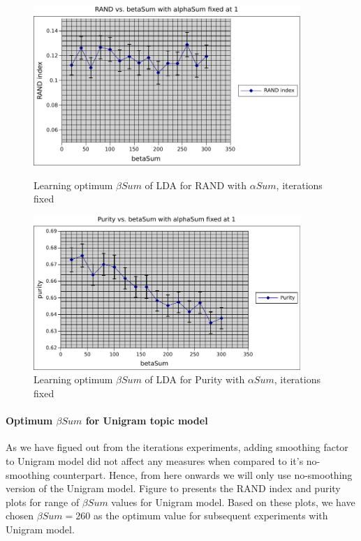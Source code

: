 \begin{figure}
    \centering
    \begin{minipage}{0.45\textwidth}
        \centering
        \includegraphics[width=0.9\textwidth]{fig/betaSum_rand_lda.pdf}
        \caption{Learning optimum $\beta Sum$ of LDA for RAND with $\alpha Sum$, iterations fixed}
    \end{minipage}\hfill
    \begin{minipage}{0.45\textwidth}
        \centering
        \includegraphics[width=0.9\textwidth]{fig/betaSum_purity_lda.pdf}
        \caption{Learning optimum $\beta Sum$ of LDA for Purity with $\alpha Sum$, iterations fixed}
    \end{minipage}
\end{figure}

\paragraph{Optimum $\beta Sum$ for Unigram topic model} As we have figued out from the iterations experiments, adding smoothing factor to Unigram model did not affect any measures when compared to it's no-smoothing counterpart. Hence, from here onwards we will only use no-smoothing version of the Unigram model. Figure to presents the RAND index and purity plots for range of $\beta Sum$ values for Unigram model. Based on these plots, we have chosen $\beta Sum = 260$ as the optimum value for subsequent experiments with Unigram model.

